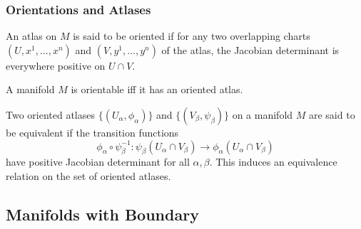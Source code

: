 \subsubsection{Orientations and Atlases}

\begin{definition}{}{}
    An atlas on \(M\) is said to be oriented if for any two overlapping charts \((U, x^1, \dots, x^n)\) and \((V, y^1, \dots, y^n)\) of the atlas, the Jacobian determinant is everywhere positive on \(U \cap V\).
\end{definition}
\begin{theorem}{}{}
    A manifold \(M\) is orientable iff it has an oriented atlas.
\end{theorem}
\begin{definition}{}{}
    Two oriented atlases \(\{ (U_\alpha, \phi_\alpha) \}\) and \(\{ (V_\beta, \psi_\beta) \}\) on a manifold \(M\) are said to be equivalent if the transition functions 
    \[
        \phi_\alpha \circ \psi_\beta^{-1} \colon \psi_\beta (U_\alpha \cap V_\beta) \rightarrow \phi_\alpha (U_\alpha \cap V_\beta)
    \]
    have positive Jacobian determinant for all \(\alpha, \beta\).
    This induces an equivalence relation on the set of oriented atlases.
\end{definition}

\subsection{Manifolds with Boundary}